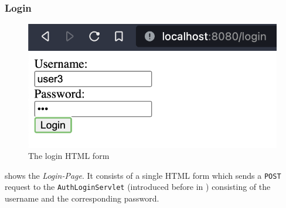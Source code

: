 \subsubsection{Login}\label{subsubsec:03_impl_servlets_login}
\begin{figure}[h]
\centering
\includegraphics[scale=0.5]{images/03_impl/login/login_form}
\caption{The login HTML form}
\label{fig:03_impl_servlets_login_form}
\end{figure}
 shows the \textit{Login-Page}. It consists of a single HTML form which sends a \texttt{POST} request to the \texttt{AuthLoginServlet} (introduced before in ) consisting of the username and the corresponding password.


